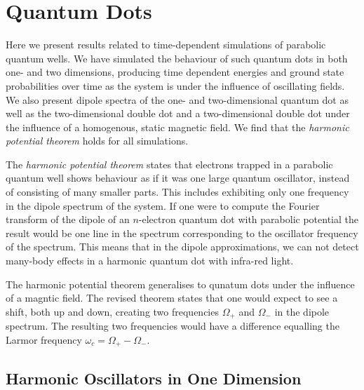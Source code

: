 \chapter{Quantum Dots}
\label{ch:quantum_dots}

Here we present results related to time-dependent simulations of parabolic quantum
wells. We have simulated the behaviour of such quantum dots in both one- and two 
dimensions, producing time dependent energies and ground state probabilities over
time as the system is under the influence of oscillating fields. We also present 
dipole spectra of the one- and two-dimensional quantum dot as well as the 
two-dimensional double dot and a two-dimensional double dot under the influence of
a homogenous, static magnetic field. We find that the \emph{harmonic potential theorem}
holds for all simulations.

The \emph{harmonic potential theorem}\cite{kohn1961cyclotron}
states that electrons trapped in a parabolic quantum well shows behaviour as if it 
was one large quantum oscillator, instead of consisting of many smaller parts. This 
includes exhibiting only one frequency in the dipole spectrum of the system. If one 
were to compute the Fourier transform of the dipole of an $n$-electron quantum dot with 
parabolic potential the result would be one line in the spectrum corresponding to the
oscillator frequency of the spectrum. This means that in the dipole approximations,
 we can not detect many-body effects in a harmonic quantum dot with infra-red light.

The harmonic potential theorem generalises to qunatum dots under the influence 
of a magntic field\cite{brey1989optical,lai2016generalized}.
The revised theorem states that one would expect to see a shift,
both up and down, creating two frequencies $\Omega_+$ and $\Omega_-$ in the dipole 
spectrum. The resulting two frequencies would have a difference 
equalling the Larmor frequency $\omega_c = \Omega_+ - \Omega_-$.

\section{Harmonic Oscillators in One Dimension}

